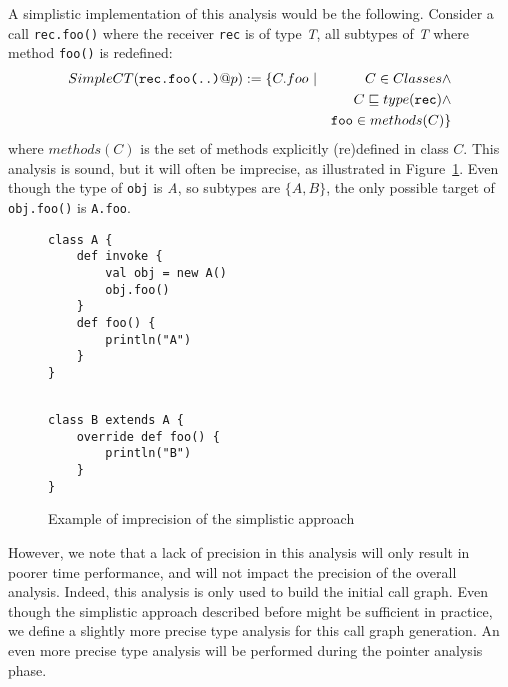 A simplistic implementation of this analysis would be the following. Consider a
call \lstinline{rec.foo()} where the receiver \lstinline{rec} is of type
\emph{T}, all subtypes of \emph{T} where method \lstinline{foo()} is redefined:
\begin{eqnarray*}
        SimpleCT(\verb/rec.foo(..)/@p) := \{C.foo ~ &|& C \in Classes \land \\
        && C \subtypeeq type(\verb/rec/) \land \\
        && \verb/foo/ \in methods(C) \}
\end{eqnarray*}
where $methods(C)$ is the set of methods explicitly (re)defined in class $C$.
This analysis is sound, but it will often be imprecise, as illustrated in
Figure~\ref{fig:ta:example2}. Even though the type of \lstinline{obj} is
\emph{A}, so subtypes are $\{A, B\}$, the only possible target of
\lstinline{obj.foo()} is \lstinline{A.foo}.

\begin{figure}[h]
    \centering

\begin{minipage}[tl]{0.6\linewidth}
    \centering
\lstset{linewidth=0.6\linewidth}
\begin{lstlisting}
class A {
    def invoke {
        val obj = new A()
        obj.foo()
    }
    def foo() {
        println("A")
    }
}
\end{lstlisting}
\end{minipage}
\begin{minipage}[tl]{0.6\linewidth}
    \centering
\lstset{linewidth=0.6\linewidth}
\begin{lstlisting}

class B extends A {
    override def foo() {
        println("B")
    }
}
\end{lstlisting}
\end{minipage}
    \caption{Example of imprecision of the simplistic approach}
    \label{fig:ta:example2}
\end{figure}

However, we note that a lack of precision in this analysis will only result in
poorer time performance, and will not impact the precision of the overall
analysis. Indeed, this analysis is only used to build the initial call graph.
Even though the simplistic approach described before might be sufficient in
practice, we define a slightly more precise type analysis for this call graph
generation. An even more precise type analysis will be performed during the
pointer analysis phase.

